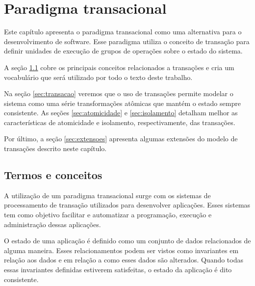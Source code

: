 \documentclass[11pt,twoside,a4paper]{book}
\begin{document}

\chapter{Paradigma transacional}
\label{chap:transacao}
Este capítulo apresenta o paradigma transacional como uma alternativa para o desenvolvimento de software. Esse paradigma utiliza o conceito de transação para definir unidades de execução de grupos de operações sobre o estado do sistema.

A seção \ref{sec:termos_e_conceitos} cobre os principais conceitos relacionados a transações e cria um vocabulário que será utilizado por todo o texto deste trabalho.

Na seção \ref{sec:transacao} veremos que o uso de transações permite modelar o sistema como uma série transformações atômicas que mantém o estado sempre consistente. As seções \ref{sec:atomicidade} e \ref{sec:isolamento} detalham melhor as características de atomicidade e isolamento, respectivamente, das transações.

Por último, a seção \ref{sec:extensoes} apresenta algumas extensões do modelo de transações descrito neste capítulo.

\section{Termos e conceitos}
\label{sec:termos_e_conceitos}
A utilização de um paradigma transacional surge com os sistemas de processamento de transação utilizados para desenvolver aplicações. Esses sistemas tem como objetivo facilitar e automatizar a programação, execução e administração dessas aplicações.

O estado de uma aplicação é definido como um conjunto de dados relacionados de alguma maneira. Esses relacionamentos podem ser vistos como invariantes em relação aos dados e em relação a como esses dados são alterados. Quando todas essas invariantes definidas estiverem satisfeitas, o estado da aplicação é dito consistente.

\end{document}
